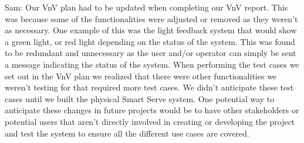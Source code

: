 \documentclass[12pt, titlepage]{article}
\begin{document}
\begin{enumerate}
  Sam: Our VnV plan had to be updated when completing our VnV report. This was because some of the functionalities were adjusted or removed as they weren't as necessary. One example of this was the light feedback system that would show a green light, or red light depending on the status of the system. This was found to be redundant and unnecessary as the user and/or operator can simply be sent a message indicating the status of the system. When performing the test cases we set out in the VnV plan we realized that there were other functionalities we weren't testing for that required more test cases. We didn't anticipate these test cases until we built the physical Smart Serve system. One potential way to anticipate these changes in future projects would be to have other stakeholders or potential users that aren't directly involved in creating or developing the project and test the system to ensure all the different use cases are covered.
  
\end{enumerate}
\end{document}

